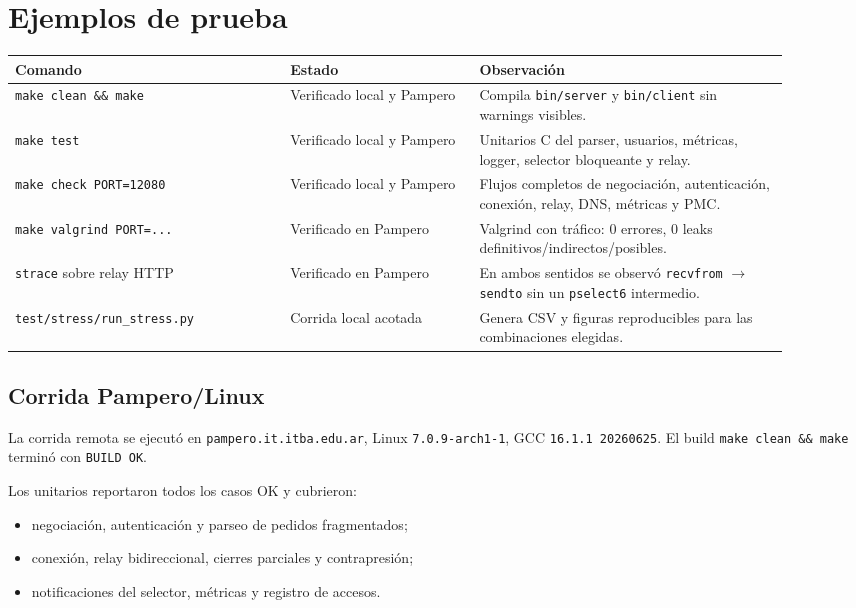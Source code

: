 \section{Ejemplos de prueba}

\begin{longtable}{>{\raggedright\arraybackslash}p{0.32\linewidth}>{\raggedright\arraybackslash}p{0.22\linewidth}>{\raggedright\arraybackslash}p{0.36\linewidth}}
\toprule
\textbf{Comando} & \textbf{Estado} & \textbf{Observación} \\
\midrule
\texttt{make clean \&\& make} & Verificado local y Pampero & Compila
\texttt{bin/server} y \texttt{bin/client} sin warnings visibles. \\
\texttt{make test} & Verificado local y Pampero & Unitarios C del parser,
usuarios, métricas, logger, selector bloqueante y relay. \\
\texttt{make check PORT=12080} & Verificado local y Pampero & Flujos completos
de negociación, autenticación, conexión, relay, DNS, métricas y PMC. \\
\texttt{make valgrind PORT=...} & Verificado en Pampero & Valgrind con tráfico:
0 errores, 0 leaks definitivos/indirectos/posibles. \\
\texttt{strace} sobre relay HTTP & Verificado en Pampero & En ambos sentidos se
observó \texttt{recvfrom} $\rightarrow$ \texttt{sendto} sin un
\texttt{pselect6} intermedio. \\
\texttt{test/stress/run\_stress.py} & Corrida local acotada & Genera CSV y
figuras reproducibles para las combinaciones elegidas. \\
\bottomrule
\end{longtable}

\subsection{Corrida Pampero/Linux}

La corrida remota se ejecutó en \texttt{pampero.it.itba.edu.ar}, Linux
\texttt{7.0.9-arch1-1}, GCC \texttt{16.1.1 20260625}. El build
\texttt{make clean \&\& make} terminó con \texttt{BUILD OK}.

Los unitarios reportaron todos los casos OK y cubrieron:
\begin{itemize}[nosep]
  \item negociación, autenticación y parseo de pedidos fragmentados;
  \item conexión, relay bidireccional, cierres parciales y contrapresión;
  \item notificaciones del selector, métricas y registro de accesos.
\end{itemize}

